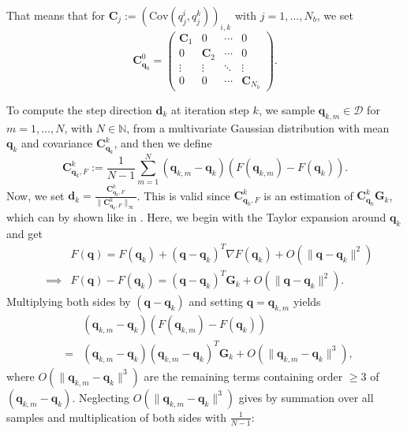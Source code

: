 That means that for $\mathbf{C}_j:=\left(\mathrm{Cov}(q_j^i,q_j^{k})\right)_{i,k}$ with $j=1,\dotsc,N_b$, we set
\begin{equation}
\label{initCov}
\mathbf{C}_{\mathbf{q}_0}^0 =
\begin{pmatrix}
  \mathbf{C}_1 & 0 & \cdots & 0 \\
  0 & \mathbf{C}_2 & \cdots & 0 \\
  \vdots  & \vdots  & \ddots & \vdots  \\
  0 & 0 & \cdots & \mathbf{C}_{N_b} 
 \end{pmatrix}.
\end{equation}

To compute the step direction $\mathbf{d}_k$ at iteration step $k$, we sample $\mathbf{q}_{k,m}\in\mathcal{D}$ for $m=1,\dotsc,N$, with $N\in\mathbb{N}$, from a multivariate Gaussian distribution with mean $\mathbf{q}_k$ and covariance $\mathbf{C}_{\mathbf{q}_k}^k$, and then we define
\begin{equation}
\label{CqkF}
\mathbf{C}_{\mathbf{q}_k,F}^k:=\frac{1}{N-1}\sum_{m=1}^N(\mathbf{q}_{k,m}-\mathbf{q}_k)(F(\mathbf{q}_{k,m})-F(\mathbf{q}_k)).
\end{equation}
Now, we set $\mathbf{d}_k=\frac{\mathbf{C}_{\mathbf{q}_k,F}^k}{\|\mathbf{C}_{\mathbf{q}_k,F}^k\|_\infty}$. This is valid since $\mathbf{C}_{\mathbf{q}_k,F}^k$ is an estimation of $\mathbf{C}_{\mathbf{q}_k}^k\mathbf{G}_k$, which can by shown like in \cite{OGUNTOLA2021109165}. Here, we begin with the Taylor expansion around $\mathbf{q}_k$ and get
\begin{eqnarray*}
&&F(\mathbf{q})=F(\mathbf{q}_k)+(\mathbf{q}-\mathbf{q}_k)^T\nabla F(\mathbf{q}_k)+O(\|\mathbf{q}-\mathbf{q}_k\|^2)\\
&\implies&F(\mathbf{q})-F(\mathbf{q}_k)=(\mathbf{q}-\mathbf{q}_k)^T\mathbf{G}_k+O(\|\mathbf{q}-\mathbf{q}_k\|^2).
\end{eqnarray*}
Multiplying both sides by $(\mathbf{q}-\mathbf{q}_k)$ and setting $\mathbf{q}=\mathbf{q}_{k,m}$ yields
\begin{eqnarray*}
&&(\mathbf{q}_{k,m}-\mathbf{q}_k)(F(\mathbf{q}_{k,m})-F(\mathbf{q}_k))\\
&=&(\mathbf{q}_{k,m}-\mathbf{q}_k)(\mathbf{q}_{k,m}-\mathbf{q}_k)^T\mathbf{G}_k+O(\|\mathbf{q}_{k,m}-\mathbf{q}_k\|^3),
\end{eqnarray*}
where $O(\|\mathbf{q}_{k,m}-\mathbf{q}_k\|^3)$ are the remaining terms containing order $\geq3$ of $(\mathbf{q}_{k,m}-\mathbf{q}_k)$. Neglecting $O(\|\mathbf{q}_{k,m}-\mathbf{q}_k\|^3)$ gives by summation over all samples and multiplication of both sides with $\frac{1}{N-1}$:
